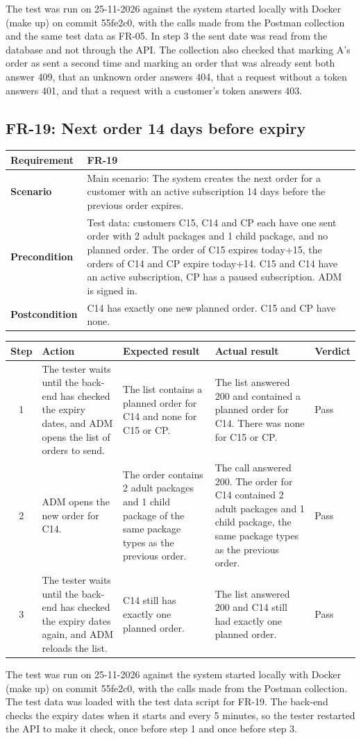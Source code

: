 \documentclass[a4paper,11pt]{article}
\newcommand{\scenarioinfo}[4]{%
  \noindent\begin{tabular}{|p{3cm}|p{12cm}|}
  \hline
  \textbf{Requirement} & \textbf{#1} \\
  \hline
  \textbf{Scenario} & #2 \\
  \hline
  \textbf{Precondition} & #3 \\
  \hline
  \textbf{Postcondition} & #4 \\
  \hline
  \end{tabular}\par\medskip}
\newenvironment{steps}{%
  \noindent\footnotesize
  \begin{tabular}{|c|p{3.6cm}|p{4.6cm}|p{3.2cm}|p{1.5cm}|}
  \hline
  \textbf{Step} & \textbf{Action} & \textbf{Expected result} & \textbf{Actual result} & \textbf{Verdict} \\
  \hline
}{%
  \end{tabular}\par\bigskip
}
\begin{document}
The test was run on 25-11-2026 against the system started locally with Docker (make up) on commit 55fe2c0, with the calls made from the Postman collection and the same test data as FR-05. In step 3 the sent date was read from the database and not through the API. The collection also checked that marking A's order as sent a second time and marking an order that was already sent both answer 409, that an unknown order answers 404, that a request without a token answers 401, and that a request with a customer's token answers 403.

\subsection{FR-19: Next order 14 days before expiry}
\scenarioinfo{FR-19}
  {Main scenario: The system creates the next order for a customer with an active subscription 14 days before the previous order expires.}
  {Test data: customers C15, C14 and CP each have one sent order with 2 adult packages and 1 child package, and no planned order. The order of C15 expires today+15, the orders of C14 and CP expire today+14. C15 and C14 have an active subscription, CP has a paused subscription. ADM is signed in.}
  {C14 has exactly one new planned order. C15 and CP have none.}
\begin{steps}
1 & The tester waits until the back-end has checked the expiry dates, and ADM opens the list of orders to send. & The list contains a planned order for C14 and none for C15 or CP. & The list answered 200 and contained a planned order for C14. There was none for C15 or CP. & Pass \\
\hline
2 & ADM opens the new order for C14. & The order contains 2 adult packages and 1 child package of the same package types as the previous order. & The call answered 200. The order for C14 contained 2 adult packages and 1 child package, the same package types as the previous order. & Pass \\
\hline
3 & The tester waits until the back-end has checked the expiry dates again, and ADM reloads the list. & C14 still has exactly one planned order. & The list answered 200 and C14 still had exactly one planned order. & Pass \\
\hline
\end{steps}

The test was run on 25-11-2026 against the system started locally with Docker (make up) on commit 55fe2c0, with the calls made from the Postman collection. The test data was loaded with the test data script for FR-19. The back-end checks the expiry dates when it starts and every 5 minutes, so the tester restarted the API to make it check, once before step 1 and once before step 3.
\end{document}
